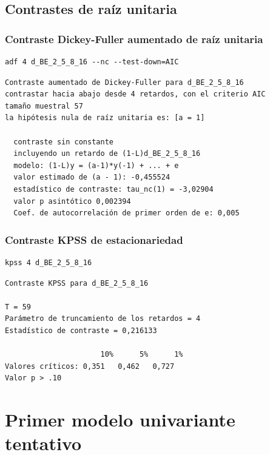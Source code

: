 \documentclass[10pt]{article}
\begin{document}
\subsection*{Contrastes de raíz unitaria}
\label{sec:org42feeeb}
\subsubsection*{Contraste Dickey-Fuller aumentado de raíz unitaria}
\label{sec:org6e44eec}

\begin{verbatim}
adf 4 d_BE_2_5_8_16 --nc --test-down=AIC
\end{verbatim}

\begin{verbatim}
Contraste aumentado de Dickey-Fuller para d_BE_2_5_8_16
contrastar hacia abajo desde 4 retardos, con el criterio AIC
tamaño muestral 57
la hipótesis nula de raíz unitaria es: [a = 1]

  contraste sin constante 
  incluyendo un retardo de (1-L)d_BE_2_5_8_16
  modelo: (1-L)y = (a-1)*y(-1) + ... + e
  valor estimado de (a - 1): -0,455524
  estadístico de contraste: tau_nc(1) = -3,02904
  valor p asintótico 0,002394
  Coef. de autocorrelación de primer orden de e: 0,005
\end{verbatim}
\subsubsection*{Contraste KPSS de estacionariedad}
\label{sec:orgc812064}

\begin{verbatim}
kpss 4 d_BE_2_5_8_16
\end{verbatim}

\begin{verbatim}
Contraste KPSS para d_BE_2_5_8_16

T = 59
Parámetro de truncamiento de los retardos = 4
Estadístico de contraste = 0,216133

                      10%      5%      1%
Valores críticos: 0,351   0,462   0,727
Valor p > .10
\end{verbatim}
\section*{Primer modelo univariante tentativo}
\label{sec:org5959734}
\end{document}
